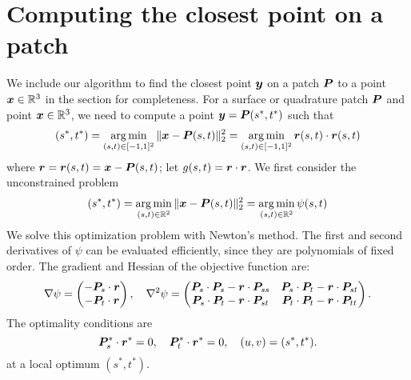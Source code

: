 
\section{Computing the closest point on a patch  \label{app:closest_point}}
We include our algorithm to find the closest point ${\bm{y}}$ on a patch ${\bm{P}}$ to a point ${\bm{x}} \in \mathbb{R}^3$ in the section for completeness.
For a surface or quadrature patch ${\bm{P}}$ and point ${\bm{x}} \in \mathbb{R}^3$, 
we need to compute a point ${\bm{y}} = {\bm{P}}(s^*, t^*)$ such that
\begin{equation}
  (s^*, t^*) = \operatorname*{arg\,min}_{(s,t) \in [-1,1]^2} \|{\bm{x}} - {\bm{P}}(s,t)\|_2^2 =  \operatorname*{arg\,min}_{(s,t) \in [-1,1]^2} {\bm{r}}(s,t)\cdot {\bm{r}}(s,t)
\end{equation}
where $ {\bm{r}} = {\bm{r}}(s,t) = {\bm{x}} - {\bm{P}}(s,t)$; let $g(s,t) = {\bm{r}}\cdot {\bm{r}}$.
We first consider the unconstrained problem
\begin{equation}
    (s^*, t^*) = \operatorname*{arg\,min}_{(s,t) \in \mathbb{R}^2} \|{\bm{x}} - {\bm{P}}(s,t)\|_2^2  = \operatorname*{arg\,min}_{(s,t) \in \mathbb{R}^2} \psi(s,t) 
\end{equation}
We solve this optimization problem with Newton's method.
The first and second derivatives of $\psi$ can be evaluated efficiently, since they are polynomials of fixed order.
The gradient and Hessian of the objective function are:
\begin{equation}
  \nabla \psi  =
  \begin{pmatrix}
    -{\bm{P}}_s\cdot {\bm{r}} \\
    -{\bm{P}}_t\cdot {\bm{r}} \\
  \end{pmatrix}, \quad
  \nabla^2 \psi = 
\begin{pmatrix}
  {\bm{P}}_s \cdot {\bm{P}}_s - {\bm{r}}\cdot {\bm{P}}_{ss} & {\bm{P}}_s \cdot {\bm{P}}_t - {\bm{r}}\cdot {\bm{P}}_{st}\\
  {\bm{P}}_s \cdot {\bm{P}}_t - {\bm{r}}\cdot {\bm{P}}_{st} & {\bm{P}}_t \cdot {\bm{P}}_t - {\bm{r}}\cdot {\bm{P}}_{tt}  \\
\end{pmatrix}.
  \label{equ:grad-hess-newton}
\end{equation}
The optimality conditions are 
\begin{equation}
{\bm{P}}_s^* \cdot {\bm{r}}^* = 0, \quad {\bm{P}}_t^* \cdot {\bm{r}}^* = 0, \quad (u,v) = (s^*, t^*).
  \label{eq:kkt}
\end{equation}
at a local optimum $(s^*, t^*)$.

